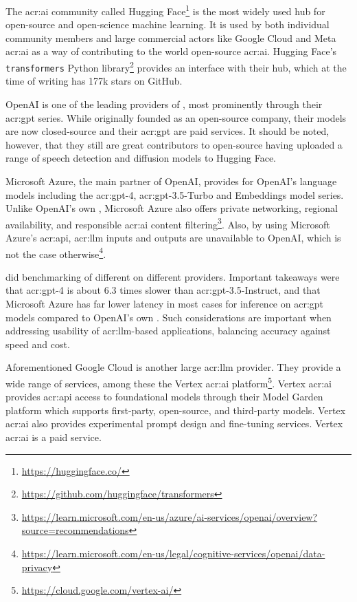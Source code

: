 The \acrshort{acr:ai} community called Hugging Face\footnote{\url{https://huggingface.co/}} is the most widely used hub for open-source and open-science machine learning. It is used by both individual community members and large commercial actors like Google Cloud and Meta \acrshort{acr:ai} as a way of contributing to the world open-source \acrshort{acr:ai}. Hugging Face's \texttt{transformers} Python library\footnote{\url{https://github.com/huggingface/transformers}} provides an interface with their hub, which at the time of writing has 177k stars on GitHub.

OpenAI is one of the leading providers of , most prominently through their \acrshort{acr:gpt} series. While originally founded as an open-source company, their models are now closed-source and their \acrshort{acr:gpt}  are paid services. It should be noted, however, that they still are great contributors to open-source having uploaded a range of speech detection and diffusion models to Hugging Face.

Microsoft Azure, the main partner of OpenAI, provides  for OpenAI's language models including the \acrshort{acr:gpt}-4, \acrshort{acr:gpt}-3.5-Turbo and Embeddings model series. Unlike OpenAI's own , Microsoft Azure also offers private networking, regional availability, and responsible \acrshort{acr:ai} content filtering\footnote{\url{https://learn.microsoft.com/en-us/azure/ai-services/openai/overview?source=recommendations}}. Also, by using Microsoft Azure's \acrshort{acr:api}, \acrshort{acr:llm} inputs and outputs are unavailable to OpenAI, which is not the case otherwise\footnote{\url{https://learn.microsoft.com/en-us/legal/cognitive-services/openai/data-privacy}}.

\cite{clearyLatencyBenchmarksComparisons2023} did benchmarking of different  on different providers. Important takeaways were that \acrshort{acr:gpt}-4 is about 6.3 times slower than \acrshort{acr:gpt}-3.5-Instruct, and that Microsoft Azure has far lower latency in most cases for inference on \acrshort{acr:gpt} models compared to OpenAI's own . Such considerations are important when addressing usability of \acrshort{acr:llm}-based applications, balancing accuracy against speed and cost.

Aforementioned Google Cloud is another large \acrshort{acr:llm} provider. They provide a wide range of services, among these the Vertex \acrshort{acr:ai} platform\footnote{\url{https://cloud.google.com/vertex-ai/}}. Vertex \acrshort{acr:ai} provides \acrshort{acr:api} access to foundational models through their Model Garden platform which supports first-party, open-source, and third-party models. Vertex \acrshort{acr:ai} also provides experimental prompt design and fine-tuning services. Vertex \acrshort{acr:ai} is a paid service.

